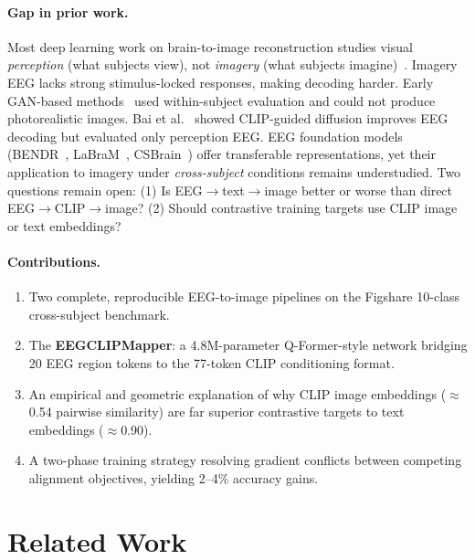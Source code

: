 \documentclass{article}
\begin{document}
\paragraph{Gap in prior work.} Most deep learning work on brain-to-image reconstruction studies visual \emph{perception} (what subjects view), not \emph{imagery} (what subjects imagine)~\citep{ozcelik2023brain,scotti2024mindeye}. Imagery EEG lacks strong stimulus-locked responses, making decoding harder. Early GAN-based methods~\citep{tirupattur2018thoughtviz,kavasidis2017brain2image} used within-subject evaluation and could not produce photorealistic images. Bai et al.~\citep{bai2023brain} showed CLIP-guided diffusion improves EEG decoding but evaluated only perception EEG. EEG foundation models (BENDR~\citep{kostas2022bendr}, LaBraM~\citep{jiang2024labram}, CSBrain~\citep{zhu2024csbrain}) offer transferable representations, yet their application to imagery under \emph{cross-subject} conditions remains understudied. Two questions remain open: (1) Is EEG$\to$text$\to$image better or worse than direct EEG$\to$CLIP$\to$image? (2) Should contrastive training targets use CLIP image or text embeddings?

\paragraph{Contributions.}
\begin{enumerate}[noitemsep,topsep=2pt]
  \item Two complete, reproducible EEG-to-image pipelines on the Figshare 10-class cross-subject benchmark.
  \item The \textbf{EEGCLIPMapper}: a 4.8M-parameter Q-Former-style network bridging 20 EEG region tokens to the 77-token CLIP conditioning format.
  \item An empirical and geometric explanation of why CLIP image embeddings ($\approx$0.54 pairwise similarity) are far superior contrastive targets to text embeddings ($\approx$0.90).
  \item A two-phase training strategy resolving gradient conflicts between competing alignment objectives, yielding 2--4\% accuracy gains.
\end{enumerate}

\section{Related Work}
\end{document}
